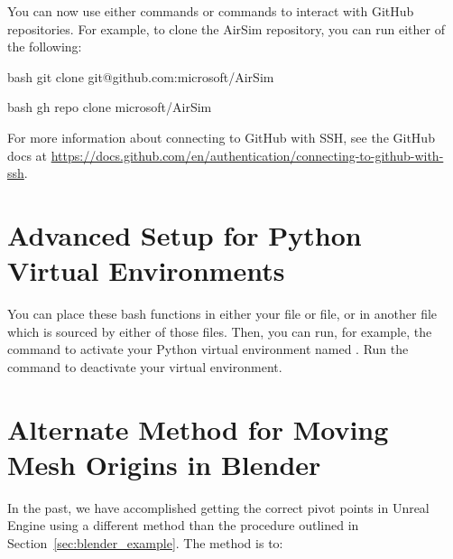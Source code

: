 You can now use either  commands or  commands to interact with GitHub repositories. For example, to clone the AirSim repository, you can run either of the following:

\begin{minttcb}[title={Clone a GitHub Repository Option 1: \texttt{git}}]{bash}
    git clone git@github.com:microsoft/AirSim
\end{minttcb}
\begin{minttcb}[title={Clone a GitHub Repository Option 2: \texttt{gh}}]{bash}
    gh repo clone microsoft/AirSim
\end{minttcb}

For more information about connecting to GitHub with SSH, see the GitHub docs at \url{https://docs.github.com/en/authentication/connecting-to-github-with-ssh}.

\section{Advanced Setup for Python Virtual Environments}\label{apdx:adv_setup_python_venv}

You can place these bash functions in either your  file or  file, or in another file which is sourced by either of those files. Then, you can run, for example, the command  to activate your Python virtual environment named . Run the command  to deactivate your virtual environment.



\section{Alternate Method for Moving Mesh Origins in Blender}\label{apdx:blender_origins_alt}
In the past, we have accomplished getting the correct pivot points in Unreal Engine using a different method than the procedure outlined in Section~\ref{sec:blender_example}. The method is to:

